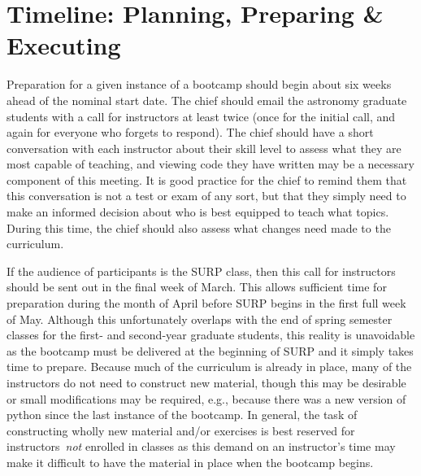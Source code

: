 
\section{Timeline: Planning, Preparing \& Executing}
\label{sec:timeline}
\noindent
Preparation for a given instance of a bootcamp should begin about six weeks
ahead of the nominal start date.
The chief should email the astronomy graduate students with a call for
instructors at least twice (once for the initial call, and again for everyone
who forgets to respond).
The chief should have a short conversation with each instructor about their
skill level to assess what they are most capable of teaching, and viewing code
they have written may be a necessary component of this meeting.
It is good practice for the chief to remind them that this conversation is not
a test or exam of any sort, but that they simply need to make an informed
decision about who is best equipped to teach what topics.
During this time, the chief should also assess what changes need made to the
curriculum.
\par
If the audience of participants is the SURP class, then this call for
instructors should be sent out in the final week of March.
This allows sufficient time for preparation during the month of April before
SURP begins in the first full week of May.
Although this unfortunately overlaps with the end of spring semester classes
for the first- and second-year graduate students, this reality is unavoidable
as the bootcamp must be delivered at the beginning of SURP and it simply takes
time to prepare.
Because much of the curriculum is already in place, many of the instructors do
not need to construct new material, though this may be desirable or small
modifications may be required, e.g., because there was a new version of python
since the last instance of the bootcamp.
In general, the task of constructing wholly new material and/or exercises is
best reserved for instructors~\textit{not} enrolled in classes as this demand
on an instructor's time may make it difficult to have the material in place
when the bootcamp begins.

